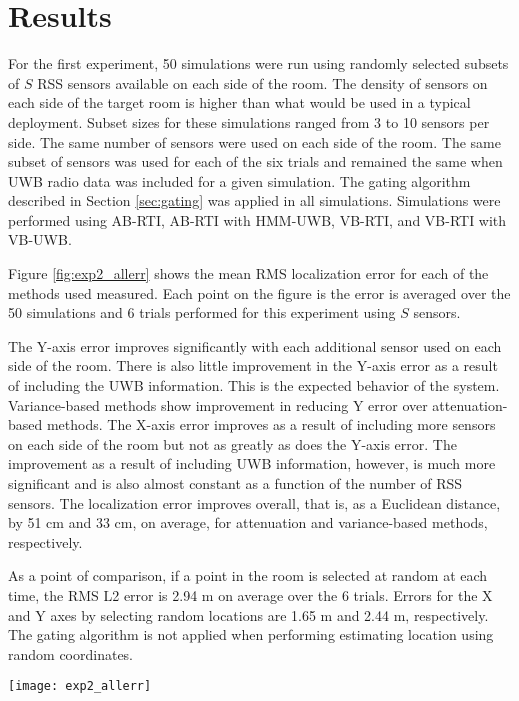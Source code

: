 \documentclass[conference]{IEEEtran}
\begin{document}
\section{Results} \label{sec:results}

For the first experiment, 50 simulations were run using randomly
selected subsets of $S$ RSS sensors available on each side of the
room. The density of sensors on each side of the target room is higher
than what would be used in a typical deployment. Subset sizes for
these simulations ranged from 3 to 10 sensors per side. The same
number of sensors were used on each side of the room. The same subset
of sensors was used for each of the six trials and remained the same
when UWB radio data was included for a given simulation. The gating
algorithm described in Section \ref{sec:gating} was applied in all
simulations. Simulations were performed using AB-RTI, AB-RTI with
HMM-UWB, VB-RTI, and VB-RTI with VB-UWB.

Figure \ref{fig:exp2_allerr} shows the mean RMS localization error for
each of the methods used measured. Each point on the figure is the
error is averaged over the 50 simulations and 6 trials performed for
this experiment using $S$ sensors.

The Y-axis error improves significantly with each additional sensor
used on each side of the room. There is also little improvement in the
Y-axis error as a result of including the UWB information. This is the
expected behavior of the system. Variance-based methods show
improvement in reducing Y error over attenuation-based methods.  The
X-axis error improves as a result of including more sensors on each
side of the room but not as greatly as does the Y-axis error. The
improvement as a result of including UWB information, however, is much
more significant and is also almost constant as a function of the
number of RSS sensors. The localization error improves overall, that
is, as a Euclidean distance, by 51 cm and 33 cm, on average, for
attenuation and variance-based methods, respectively.

As a point of comparison, if a point in the room is selected at random
at each time, the RMS L2 error is 2.94 m on average over the 6
trials. Errors for the X and Y axes by selecting random locations are
1.65 m and 2.44 m, respectively. The gating algorithm is not applied
when performing estimating location using random coordinates.

\begin{figure*}[htb]
    \centerline{\texttt{[image: exp2\_allerr]}}
    \caption{From left to right, the mean RMS L2, X, and Y errors over the 6 trials and 50 simulations using random subsets of $S$ sensors per side of the study room.}
    \label{fig:exp2_allerr}
\end{figure*}
\end{document}
